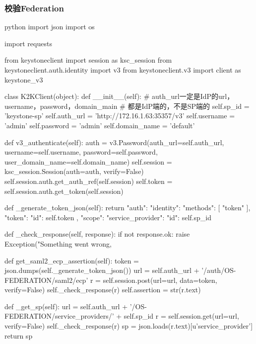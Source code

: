 \subsubsection{校验Federation}
\begin{code-block}{python}
import json
import os

import requests

from keystoneclient import session as ksc_session
from keystoneclient.auth.identity import v3
from keystoneclient.v3 import client as keystone_v3


class K2KClient(object):
    def __init__(self):
        # auth_url一定是IdP的url，username，password，domain_main
        # 都是IdP端的，不是SP端的
        self.sp_id = 'keystone-sp'
        self.auth_url = 'http://172.16.1.63:35357/v3'
        self.username = 'admin'
        self.password = 'admin'
        self.domain_name = 'default'

    def v3_authenticate(self):
        auth = v3.Password(auth_url=self.auth_url,
                           username=self.username,
                           password=self.password,
                           user_domain_name=self.domain_name)
        self.session = ksc_session.Session(auth=auth, verify=False)
        self.session.auth.get_auth_ref(self.session)
        self.token = self.session.auth.get_token(self.session)

    def _generate_token_json(self):
        return {
            "auth": {
                "identity": {
                    "methods": [
                        "token"
                    ],
                    "token": {
                        "id": self.token
                    }
                },
                "scope": {
                    "service_provider": {
                        "id": self.sp_id
                    }
                }
            }
        }

    def _check_response(self, response):
        if not response.ok:
            raise Exception("Something went wrong, %

    def get_saml2_ecp_assertion(self):
        token = json.dumps(self._generate_token_json())
        url = self.auth_url + '/auth/OS-FEDERATION/saml2/ecp'
        r = self.session.post(url=url, data=token, verify=False)
        self._check_response(r)
        self.assertion = str(r.text)

    def _get_sp(self):
        url = self.auth_url + '/OS-FEDERATION/service_providers/' + self.sp_id
        r = self.session.get(url=url, verify=False)
        self._check_response(r)
        sp = json.loads(r.text)[u'service_provider']
        return sp


\end{code-block}
